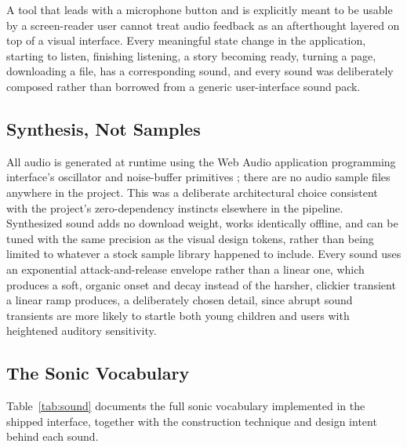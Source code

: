 \documentclass[conference]{IEEEtran}
\begin{document}
A tool that leads with a microphone button and is explicitly meant to be usable by a screen-reader user cannot treat audio feedback as an afterthought layered on top of a visual interface. Every meaningful state change in the application, starting to listen, finishing listening, a story becoming ready, turning a page, downloading a file, has a corresponding sound, and every sound was deliberately composed rather than borrowed from a generic user-interface sound pack.

\subsection{Synthesis, Not Samples}

All audio is generated at runtime using the Web Audio application programming interface's oscillator and noise-buffer primitives \cite{w3cwebaudio}; there are no audio sample files anywhere in the project. This was a deliberate architectural choice consistent with the project's zero-dependency instincts elsewhere in the pipeline. Synthesized sound adds no download weight, works identically offline, and can be tuned with the same precision as the visual design tokens, rather than being limited to whatever a stock sample library happened to include. Every sound uses an exponential attack-and-release envelope rather than a linear one, which produces a soft, organic onset and decay instead of the harsher, clickier transient a linear ramp produces, a deliberately chosen detail, since abrupt sound transients are more likely to startle both young children and users with heightened auditory sensitivity.

\subsection{The Sonic Vocabulary}

Table~\ref{tab:sound} documents the full sonic vocabulary implemented in the shipped interface, together with the construction technique and design intent behind each sound.
\end{document}

